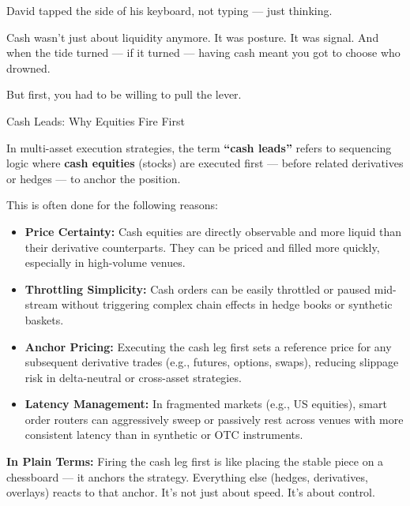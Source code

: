 David tapped the side of his keyboard, not typing — just thinking.

Cash wasn’t just about liquidity anymore. It was posture. It was signal. And when the tide turned — if it turned — having cash meant you got to choose who drowned.

But first, you had to be willing to pull the lever.

\medskip

\begin{TechnicalSidebar}{Cash Leads: Why Equities Fire First}

    In multi-asset execution strategies, the term \textbf{``cash leads''} refers to sequencing logic where 
    \textbf{cash equities} (stocks) are executed first — before related derivatives or hedges — to anchor the position.
    
    \medskip
    
    This is often done for the following reasons:

    \medskip
    
    \begin{itemize}
      \item \textbf{Price Certainty:}  
      Cash equities are directly observable and more liquid than their derivative counterparts. They can be priced and filled more quickly, especially in high-volume venues.
    
      \item \textbf{Throttling Simplicity:}  
      Cash orders can be easily throttled or paused mid-stream without triggering complex chain effects in hedge books or synthetic baskets.
    
      \item \textbf{Anchor Pricing:}  
      Executing the cash leg first sets a reference price for any subsequent derivative trades (e.g., futures, options, swaps), reducing slippage risk in delta-neutral or cross-asset strategies.
    
      \item \textbf{Latency Management:}  
      In fragmented markets (e.g., US equities), smart order routers can aggressively sweep or passively rest across venues with more consistent latency than in synthetic or OTC instruments.
    \end{itemize}
    
    \medskip
    
    \textbf{In Plain Terms:}  
    Firing the cash leg first is like placing the stable piece on a chessboard — it anchors the strategy.  
    Everything else (hedges, derivatives, overlays) reacts to that anchor.  
    It’s not just about speed.  
    It’s about control.
    
\end{TechnicalSidebar}

